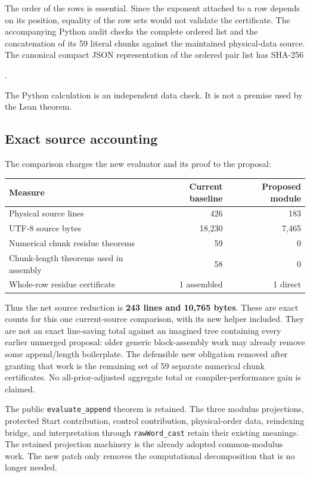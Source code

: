 \documentclass[11pt,a4paper]{article}
\newcommand{\code}[1]{\texttt{#1}}
\begin{document}
The order of the rows is essential. Since the exponent attached to a row depends on its position, equality of the row sets would not validate the certificate. The accompanying Python audit checks the complete ordered list and the concatenation of its 59 literal chunks against the maintained physical-data source. The canonical compact JSON representation of the ordered pair list has SHA-256
\begin{center}
\small{}.
\end{center}
The Python calculation is an independent data check. It is not a premise used by the Lean theorem.\cite{physicaldata}

\subsection{Exact source accounting}

The comparison charges the new evaluator and its proof to the proposal:
\begin{center}
\begin{tabular}{@{}lrr@{}}
\toprule
Measure & Current baseline & Proposed module\\
\midrule
Physical source lines & 426 & 183\\
UTF-8 source bytes & 18,230 & 7,465\\
Numerical chunk residue theorems & 59 & 0\\
Chunk-length theorems used in assembly & 58 & 0\\
Whole-row residue certificate & 1 assembled & 1 direct\\
\bottomrule
\end{tabular}
\end{center}
Thus the net source reduction is \textbf{243 lines and 10,765 bytes}. These are exact counts for this one current-source comparison, with its new helper included. They are not an exact line-saving total against an imagined tree containing every earlier unmerged proposal: older generic block-assembly work may already remove some append/length boilerplate. The defensible new obligation removed after granting that work is the remaining set of 59 separate numerical chunk certificates. No all-prior-adjusted aggregate total or compiler-performance gain is claimed.

The public \code{evaluate\_append} theorem is retained. The three modulus projections, protected Start contribution, control contribution, physical-order data, reindexing bridge, and interpretation through \code{rawWord\_cast} retain their existing meanings. The retained projection machinery is the already adopted common-modulus work. The new patch only removes the computational decomposition that is no longer needed.
\end{document}
